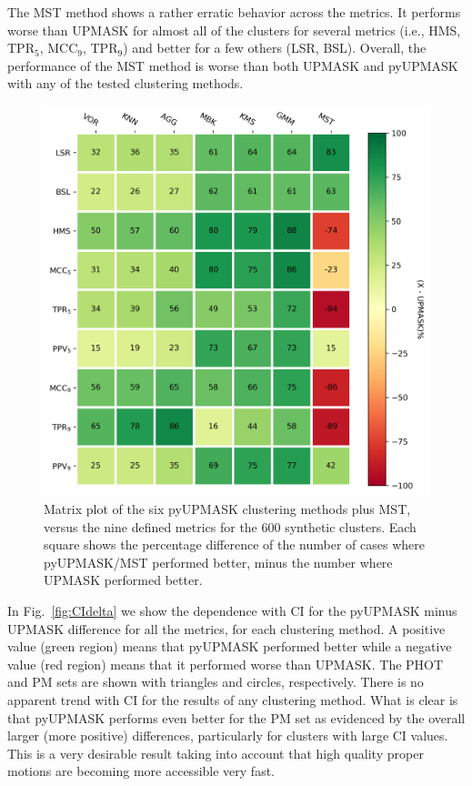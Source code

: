 \documentclass[draft]{aa}
\begin{document}
 The MST method shows a rather erratic behavior across the metrics. It
 performs worse than UPMASK for almost all of the clusters for several metrics
 (i.e., HMS, TPR$_5$, MCC$_9$, TPR$_9$) and better for a few others (LSR, BSL).
 Overall, the performance of the MST method is worse than both UPMASK and
 pyUPMASK with any of the tested clustering methods.\\

 \begin{figure}
 \includegraphics[width=\hsize]{figs/matrix.png}
 \caption{Matrix plot of the six pyUPMASK clustering methods plus MST, versus
 the nine defined metrics for the 600 synthetic clusters. Each square shows
 the percentage difference of the number of cases where pyUPMASK/MST performed
 better, minus the number where UPMASK performed better.}
 \label{fig:matrix}
 \end{figure}

 In Fig.~\ref{fig:CIdelta} we show the dependence with CI for the pyUPMASK
 minus UPMASK difference for all the metrics, for each clustering method. A
 positive value (green region) means that pyUPMASK performed better while a
 negative value (red region) means that it performed worse than UPMASK. The
 PHOT and PM sets are shown with triangles and circles, respectively.
 There is no apparent trend with CI for the results of any clustering method.
 What is clear is that pyUPMASK performs even better for the PM set as
 evidenced by the overall larger (more positive) differences, particularly for
 clusters with large CI values. This is a very desirable result taking into
 account that high quality proper motions are becoming more accessible very
 fast.\\
\end{document}
